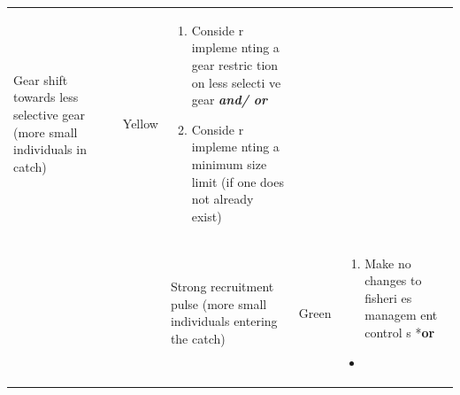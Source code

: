 \documentclass[]{book}
\providecommand{\tightlist}{%
  \setlength{\itemsep}{0pt}\setlength{\parskip}{0pt}}
\begin{document}
\begin{longtable}[]{@{}lllll@{}}
\begin{minipage}[t]{0.19\columnwidth}
Gear shift towards less selective gear (more small individuals in
catch)\strut
\end{minipage} & \begin{minipage}[t]{0.19\columnwidth}\raggedright\strut
Yellow\strut
\end{minipage} & \begin{minipage}[t]{0.19\columnwidth}\raggedright\strut
\begin{enumerate}
\def\labelenumi{\arabic{enumi}.}
\item
  Conside r impleme nting a gear restric tion on less selecti ve gear
  \textbf{\emph{and/ or}}
\item
  Conside r impleme nting a minimum size limit (if one does not already
  exist)
\end{enumerate}\strut
\end{minipage}\tabularnewline
\begin{minipage}[t]{0.19\columnwidth}\raggedright\strut
\strut
\end{minipage} & \begin{minipage}[t]{0.19\columnwidth}\raggedright\strut
\strut
\end{minipage} & \begin{minipage}[t]{0.19\columnwidth}\raggedright\strut
Strong recruitment pulse (more small individuals entering the
catch)\strut
\end{minipage} & \begin{minipage}[t]{0.19\columnwidth}\raggedright\strut
Green\strut
\end{minipage} & \begin{minipage}[t]{0.19\columnwidth}\raggedright\strut
\begin{enumerate}
\def\labelenumi{\arabic{enumi}.}
\tightlist
\item
  Make no changes to fisheri es managem ent control s *\textbf{or}
\end{enumerate}

\begin{itemize}
\item
\end{itemize}


\end{minipage}
\end{longtable}
\end{document}
